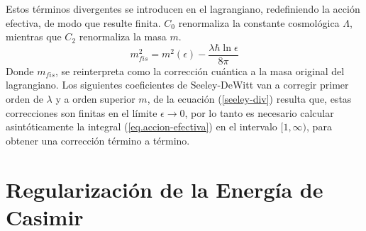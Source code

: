 Estos términos divergentes se introducen en el lagrangiano, redefiniendo la acción efectiva, de modo que resulte finita. $C_0$ renormaliza la constante cosmológica $\Lambda$, mientras que  $C_2$ renormaliza la masa $m$.
\begin{equation}
m ^2 _{fis} = m ^2 ( \epsilon )  - \frac{\lambda \hbar \ln \epsilon}{8 \pi}
\end{equation}
Donde $m _{fis}$, se reinterpreta como la corrección cuántica a la masa original del lagrangiano. Los siguientes coeficientes de  Seeley-DeWitt van a corregir primer orden de $\lambda$ y a orden superior $m$, de la ecuación (\ref{seeley-div}) resulta que, estas correcciones son finitas en el límite $\epsilon \rightarrow 0$, por lo tanto es necesario calcular asintóticamente la integral (\ref{eq.accion-efectiva}) en el intervalo $[1, \infty)$, para obtener una corrección término a término.

\section{Regularización de la Energía de Casimir}\label{cap.casimir}

